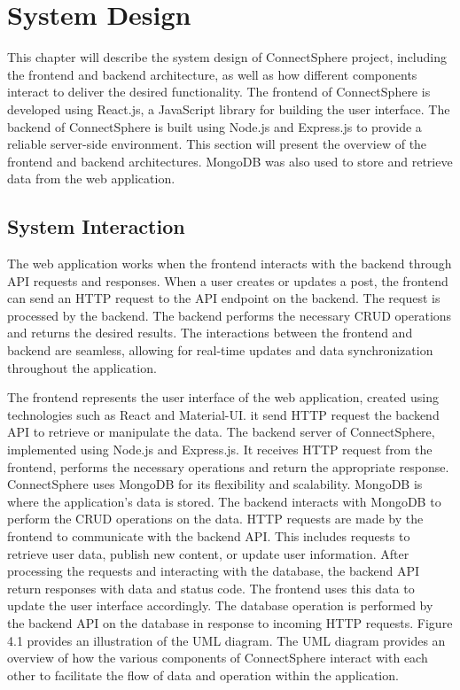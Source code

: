 \chapter{System Design}
This chapter will describe the system design of ConnectSphere project, including the frontend and backend architecture, as well as how different components interact to deliver the desired functionality. The frontend of ConnectSphere is developed using React.js, a JavaScript library for building the user interface. The backend of ConnectSphere is built using Node.js and Express.js to provide a reliable server-side environment. This section will present the overview of the frontend and backend architectures. MongoDB was also used to store and retrieve data from the web application.

\section{System Interaction}
The web application works when the frontend interacts with the backend through API requests and responses. When a user creates
or updates a post, the frontend can send an HTTP request to the API endpoint on the backend. The request is processed by the backend. The backend performs the necessary CRUD operations and returns the desired results. The interactions between the  frontend and backend are seamless, allowing for real-time updates and data synchronization throughout the application.

The frontend represents the user interface of the web application, created using technologies such as React and Material-UI. it send HTTP request the backend API to retrieve or manipulate the data. The backend server of ConnectSphere, implemented using Node.js and Express.js. It receives HTTP request from the frontend, performs the necessary operations and return the appropriate response. ConnectSphere uses MongoDB for its flexibility and scalability. MongoDB is where the application's data is stored. The backend interacts with MongoDB to perform the CRUD operations on the data. HTTP requests are made by the frontend to communicate with the backend API. This includes requests to retrieve user data, publish new content, or update user information. After processing the requests and interacting with the database, the backend API return responses with data and status code. The frontend uses this data to update the user interface accordingly. The database operation is performed by the backend API on the database in response to incoming  HTTP requests. Figure 4.1 provides an illustration of the UML diagram. The UML diagram provides an overview of how the various components of ConnectSphere interact with each other to facilitate the flow of data and operation within the application.

